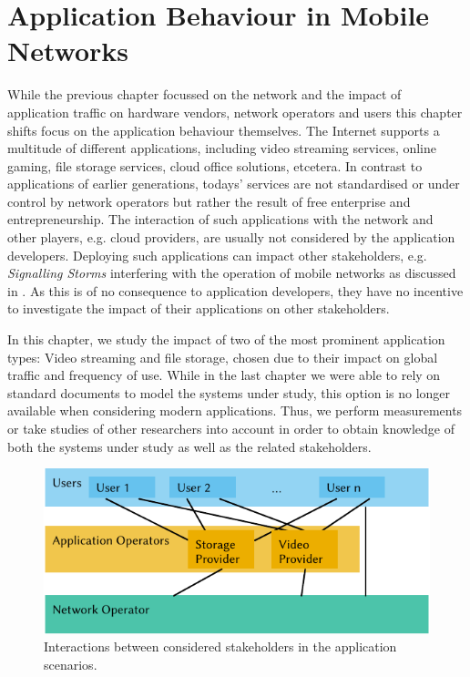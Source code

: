 \chapter{Application Behaviour in Mobile Networks}\label{chap:application}

\newcommand{\download}{Download\xspace}
\newcommand{\live}{Live\xspace}
\newcommand{\serviceprovisioning}{Provisioning\xspace}
\newcommand{\streaming}{Streaming\xspace}

While the previous chapter focussed on the network and the impact of application traffic on hardware vendors, network operators and users this chapter shifts focus on the application behaviour themselves.
The Internet supports a multitude of different applications, including video streaming services, online gaming, file storage services, cloud office solutions, etcetera.
In contrast to applications of earlier generations, todays' services are not standardised or under control by network operators but rather the result of free enterprise and entrepreneurship.
The interaction of such applications with the network and other players, e.g. cloud providers, are usually not considered by the application developers.
Deploying such applications can impact other stakeholders, e.g. \emph{Signalling Storms} interfering with the operation of mobile networks as discussed in .
As this is of no consequence to application developers, they have no incentive to investigate the impact of their applications on other stakeholders.

In this chapter, we study the impact of two of the most prominent application types: Video streaming and file storage, chosen due to their impact on global traffic and frequency of use.
While in the last chapter we were able to rely on standard documents to model the systems under study, this option is no longer available when considering modern applications.
Thus, we perform measurements or take studies of other researchers into account in order to obtain knowledge of both the systems under study as well as the related stakeholders.

\begin{figure}
  \centering
  \includegraphics{application/figures/stakeholders}
  \caption{Interactions between considered stakeholders in the application scenarios.}
  \label{fig:application:stakeholders}
\end{figure}

